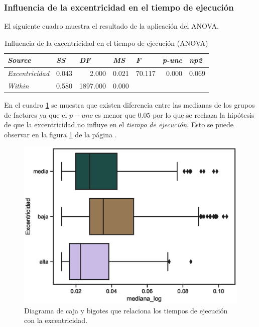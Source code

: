 \documentclass{article}
\begin{document}
\subsubsection{Influencia de la excentricidad en el tiempo de ejecución}
El siguiente cuadro muestra el resultado de la aplicación del ANOVA.

\begin{table}[htbp]
  \centering
  \caption{Influencia de la excentricidad en el tiempo de ejecución (ANOVA)}
    \begin{tabular}{lrrrrrr}
    \toprule
    \textit{\textbf{Source}} & \multicolumn{1}{l}{\textit{\textbf{SS}}} & \multicolumn{1}{l}{\textit{\textbf{DF}}} & \multicolumn{1}{l}{\textit{\textbf{MS}}} & \multicolumn{1}{l}{\textit{\textbf{F}}} & \multicolumn{1}{l}{\textit{\textbf{p-unc}}} & \multicolumn{1}{l}{\textit{\textbf{np2}}} \\
    \midrule
    \textit{Excentricidad} & 0.043 & 2.000 & 0.021 & 70.117 & 0.000 & 0.069 \\
    \textit{Within} & 0.580 & 1897.000 & 0.000 &       &       &  \\
    \bottomrule
    \end{tabular}%
  \label{tab:t10}%
\end{table}%

En el cuadro \ref{tab:t10} se muestra que existen diferencia entre las medianas de los grupos de factores ya que el \emph{$p-unc$} es menor que $0.05$ por lo que se rechaza la hipótesis de que la excentricidad no influye en el \textit{tiempo de ejecución}. Esto se puede observar en la figura \ref{fig17} de la página \pageref{fig17}.

\begin{center}
\begin{figure}[htbp]
\includegraphics[scale=0.6]{boxplot_Excentricidad.eps}
\caption{Diagrama de caja y bigotes que relaciona los tiempos de ejecución con la excentricidad.}
\label{fig17}
\end{figure}
\end{center}
\end{document}
